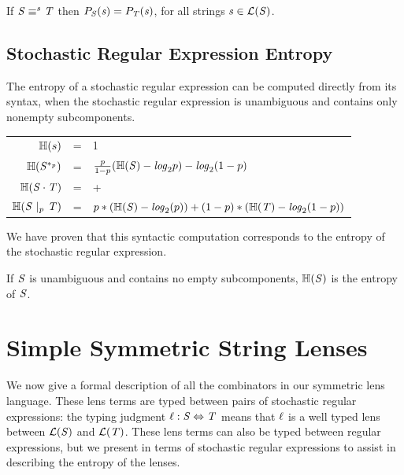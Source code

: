 \documentclass[acmsmall,screen,anonymous]{acmart}
\begin{document}
\begin{theorem}
  If $\mathit{S} \equiv^s \mathit{T}$ then $P_{\mathit{S}}(\mathit{s}) =
  P_{\mathit{T}}(\mathit{s})$, for all strings $\mathit{s} \in \mathcal{L}(\mathit{S})$.
\end{theorem}

\subsection{Stochastic Regular Expression Entropy}
The entropy of a stochastic regular expression can be computed directly from its
syntax, when the stochastic regular expression is unambiguous and contains only
nonempty subcomponents.
\begin{center}
  \begin{tabular}{rcl}
    $\mathbb{H}(s)$
    & =
    & 1\\
    
    $\mathbb{H}(\mathit{S}^{*_{p}})$
    & =
    & $\frac{p}{1-p}(\mathbb{H}(\mathit{S}) - \mathit{log}_2p)
      - \mathit{log}_2(1-p)$\\
    
    $\mathbb{H}({\mathit{S}\cdot\mathit{T}})$
    & =
    & \EntropyOf{\Regex} + \EntropyOf{\RegexAlt}\\
    
    $\mathbb{H}(\mathit{S}~|_{p}~\mathit{T})$
    & =
    & $p*(\mathbb{H}(\mathit{S}) - \mathit{log}_2(p)) + (1-p)*(\mathbb{H}(\mathit{T}) - \mathit{log}_2(1-p))$\\
  \end{tabular}
\end{center}
We have proven that this syntactic computation corresponds to the entropy of the
stochastic regular expression.

\begin{theorem}
  \label{thm:correct_entropy}
  If $\mathit{S}$ is unambiguous and contains no empty subcomponents,
  $\mathbb{H}(\mathit{S})$ is the entropy of $\mathit{S}$.
\end{theorem}


\section{Simple Symmetric String Lenses}
\label{sec:ssl}
We now give a formal description of all the combinators in our symmetric lens
language. These lens terms are typed between pairs of stochastic regular
expressions: the typing judgment $\mathit{\ell} : \mathit{S} \Leftrightarrow
\mathit{T}$ means that $\mathit{\ell}$ is a well typed lens between $\mathcal{L}(\mathit{S})$
and $\mathcal{L}(\mathit{T})$. These lens terms can also be typed between regular
expressions, but we present in terms of stochastic regular expressions to assist
in describing the entropy of the lenses.
\end{document}
